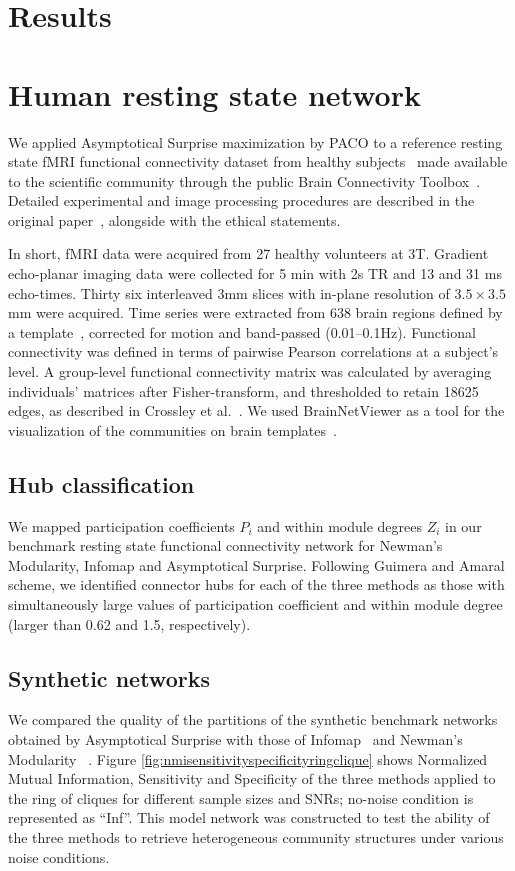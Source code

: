 
\section{Results}
\section{Human resting state network}
We applied Asymptotical Surprise maximization by PACO to a reference resting state fMRI functional connectivity dataset from healthy subjects~\cite{crossley2013a} made available to the scientific community through the public Brain Connectivity Toolbox~\cite{rubinov2010}. 
Detailed experimental and image processing procedures are described in the original paper~\cite{crossley2013a}, alongside with the ethical statements.

In short, fMRI data were acquired from 27 healthy volunteers at 3T.
Gradient echo-planar imaging data were collected for 5 min with 2s TR and 13 and 31 ms echo-times. Thirty six interleaved 3mm slices with in-plane resolution of $3.5\times 3.5$ mm were acquired.
Time series were extracted from 638 brain regions defined by a template~\cite{crossley2013a}, corrected for motion and band-passed (0.01–0.1Hz). Functional connectivity was defined in terms of pairwise Pearson correlations at a subject's level.
A group-level functional connectivity matrix was calculated by averaging individuals' matrices after Fisher-transform, and thresholded to retain 18625 edges, as described in Crossley et al.~\cite{crossley2013a}.
We used BrainNetViewer as a tool for the visualization of the communities on brain templates~\cite{xia2013}.


\subsection{Hub classification}
We mapped participation coefficients $P_i$ and within module degrees $Z_i$ in our benchmark resting state functional connectivity network for Newman's Modularity, Infomap and Asymptotical Surprise. Following Guimera and Amaral scheme, we identified connector hubs for each of the three methods as those with simultaneously large values of participation coefficient and within module degree (larger than 0.62 and 1.5, respectively).


\subsection{Synthetic networks}
We compared the quality of the partitions of the synthetic benchmark networks obtained by Asymptotical Surprise with those of Infomap~\cite{rosvall2008} and Newman's Modularity ~\cite{newman2006,blondel2008}. Figure \ref{fig:nmisensitivityspecificityringclique} shows Normalized Mutual Information, Sensitivity and Specificity of the three methods applied to the ring of cliques for different sample sizes and SNRs; no-noise condition is represented as ``Inf''.
This model network was constructed to test the ability of the three methods to retrieve heterogeneous community structures under various noise conditions.

